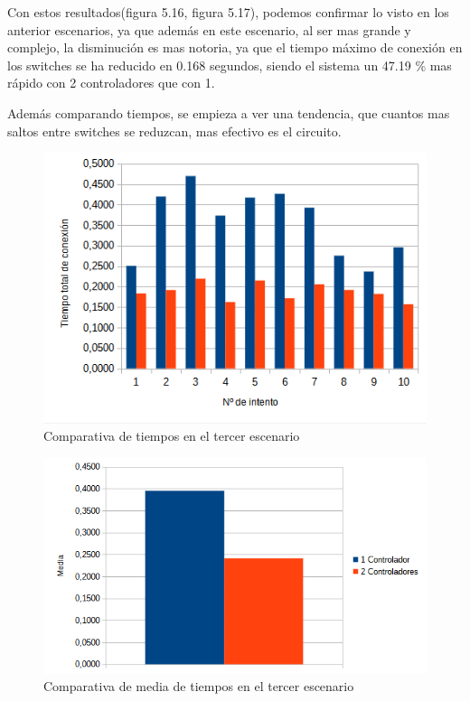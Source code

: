 \documentclass[a4paper, 12pt]{book}
\begin{document}
 	Con estos resultados(figura 5.16, figura 5.17), podemos confirmar lo visto en los anterior escenarios, ya que además en este escenario, al ser mas grande y complejo, la disminución es mas notoria, ya que el tiempo máximo de conexión en los switches se ha reducido en 0.168 segundos, siendo el sistema un 47.19 \% mas rápido con 2 controladores que con 1.
 	
 	Además comparando tiempos, se empieza a ver una tendencia, que cuantos mas saltos entre switches se reduzcan, mas efectivo es el circuito.
 	
 	\begin{figure}[H]
 		\centering
 		\includegraphics[width=12cm, keepaspectratio]{img/comparativaescenario3}
 		\caption{Comparativa de tiempos en el tercer escenario}
 		\label{figura:comparativab4}
 	\end{figure}
 	
 	
 	
 	\begin{figure}[H]
 		\centering
 		\includegraphics[width=12cm, keepaspectratio]{img/comparativamediaescenario3}
 		\caption{Comparativa de media de tiempos en el tercer escenario}
 		\label{figura:mediab4}
 	\end{figure}
 	
\end{document}
